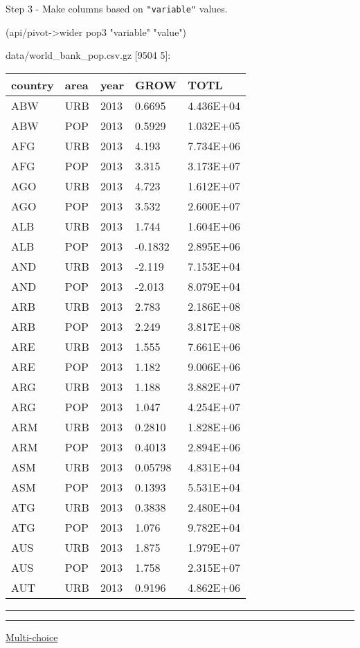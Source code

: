 \documentclass[]{article}
\newenvironment{Shaded}{\begin{snugshade}}{\end{snugshade}}
\newcommand{\StringTok}[1]{\textcolor[rgb]{0.31,0.60,0.02}{#1}}
\newcommand{\NormalTok}[1]{#1}
\begin{document}
Step 3 - Make columns based on \texttt{"variable"} values.

\begin{Shaded}
\begin{Highlighting}[]
\NormalTok{(api/pivot->wider pop3 }\StringTok{"variable"} \StringTok{"value"}\NormalTok{)}
\end{Highlighting}
\end{Shaded}

data/world\_bank\_pop.csv.gz {[}9504 5{]}:

\begin{longtable}[]{@{}lllll@{}}
\toprule
country & area & year & GROW & TOTL\tabularnewline
\midrule
\endhead
ABW & URB & 2013 & 0.6695 & 4.436E+04\tabularnewline
ABW & POP & 2013 & 0.5929 & 1.032E+05\tabularnewline
AFG & URB & 2013 & 4.193 & 7.734E+06\tabularnewline
AFG & POP & 2013 & 3.315 & 3.173E+07\tabularnewline
AGO & URB & 2013 & 4.723 & 1.612E+07\tabularnewline
AGO & POP & 2013 & 3.532 & 2.600E+07\tabularnewline
ALB & URB & 2013 & 1.744 & 1.604E+06\tabularnewline
ALB & POP & 2013 & -0.1832 & 2.895E+06\tabularnewline
AND & URB & 2013 & -2.119 & 7.153E+04\tabularnewline
AND & POP & 2013 & -2.013 & 8.079E+04\tabularnewline
ARB & URB & 2013 & 2.783 & 2.186E+08\tabularnewline
ARB & POP & 2013 & 2.249 & 3.817E+08\tabularnewline
ARE & URB & 2013 & 1.555 & 7.661E+06\tabularnewline
ARE & POP & 2013 & 1.182 & 9.006E+06\tabularnewline
ARG & URB & 2013 & 1.188 & 3.882E+07\tabularnewline
ARG & POP & 2013 & 1.047 & 4.254E+07\tabularnewline
ARM & URB & 2013 & 0.2810 & 1.828E+06\tabularnewline
ARM & POP & 2013 & 0.4013 & 2.894E+06\tabularnewline
ASM & URB & 2013 & 0.05798 & 4.831E+04\tabularnewline
ASM & POP & 2013 & 0.1393 & 5.531E+04\tabularnewline
ATG & URB & 2013 & 0.3838 & 2.480E+04\tabularnewline
ATG & POP & 2013 & 1.076 & 9.782E+04\tabularnewline
AUS & URB & 2013 & 1.875 & 1.979E+07\tabularnewline
AUS & POP & 2013 & 1.758 & 2.315E+07\tabularnewline
AUT & URB & 2013 & 0.9196 & 4.862E+06\tabularnewline
\bottomrule
\end{longtable}

\begin{center}\rule{0.5\linewidth}{0.5pt}\end{center}

\begin{center}\rule{0.5\linewidth}{0.5pt}\end{center}

\href{https://tidyr.tidyverse.org/articles/pivot.html\#multi-choice}{Multi-choice}
\end{document}
